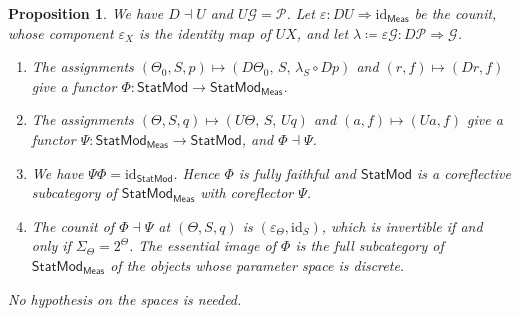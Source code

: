 \documentclass[11pt,a4paper]{article}
\theoremstyle{plain}
\newtheorem{proposition}[theorem]{Proposition}
\theoremstyle{definition}
\theoremstyle{remark}
\newcommand{\cat}[1]{\mathsf{#1}}
\newcommand{\Meas}{\cat{Meas}}
\newcommand{\G}{\mathcal{G}}
\newcommand{\Prb}{\mathcal{P}}
\newcommand{\id}{\mathrm{id}}
\newcommand{\StatMod}{\cat{StatMod}}
\newcommand{\Statk}{\StatMod_{\Meas}}
\begin{document}
\begin{proposition}\label{prop:coreflection}
We have $D \dashv U$ and $U\G = \Prb$. Let
$\varepsilon \colon DU \Rightarrow \id_{\Meas}$ be the counit, whose component
$\varepsilon_X$ is the identity map of $UX$, and let
$\lambda \coloneqq \varepsilon\G \colon D\Prb \Rightarrow \G$.
\begin{enumerate}
\item The assignments
$(\Theta_0, S, p) \mapsto (D\Theta_0,\, S,\, \lambda_S \circ Dp)$ and
$(r,f) \mapsto (Dr, f)$ give a functor $\Phi \colon \StatMod \to \Statk$.
\item The assignments $(\Theta, S, q) \mapsto (U\Theta,\, S,\, Uq)$ and
$(a,f) \mapsto (Ua, f)$ give a functor $\Psi \colon \Statk \to \StatMod$, and
$\Phi \dashv \Psi$.
\item We have $\Psi\Phi = \id_{\StatMod}$. Hence $\Phi$ is fully faithful and
$\StatMod$ is a coreflective subcategory of $\Statk$ with coreflector $\Psi$.
\item The counit of $\Phi \dashv \Psi$ at $(\Theta, S, q)$ is
$(\varepsilon_{\Theta}, \id_S)$, which is invertible if and only if
$\Sigma_{\Theta} = 2^{\Theta}$. The essential image of $\Phi$ is the full
subcategory of $\Statk$ of the objects whose parameter space is discrete.
\end{enumerate}
No hypothesis on the spaces is needed.
\end{proposition}
\end{document}
